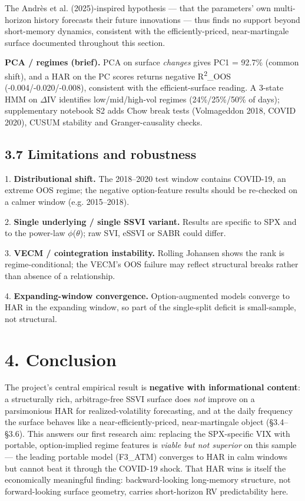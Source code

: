 \documentclass[10pt,a4paper]{article}
\begin{document}
The Andr\`{e}s et al. (2025)-inspired hypothesis --- that the parameters' own multi-horizon history forecasts their future innovations --- thus finds no support beyond short-memory dynamics, consistent with the efficiently-priced, near-martingale surface documented throughout this section.

\noindent \textbf{PCA / regimes (brief).} PCA on surface \textit{changes} gives PC1 = 92.7\% (common shift), and a HAR on the PC scores returns negative R\textsuperscript{2}\_OOS (-0.004/-0.020/-0.008), consistent with the efficient-surface reading. A 3-state HMM on $\Delta$IV identifies low/mid/high-vol regimes (24\%/25\%/50\% of days); supplementary notebook S2 adds Chow break tests (Volmageddon 2018, COVID 2020), CUSUM stability and Granger-causality checks.

\subsection*{3.7 Limitations and robustness}

1. \textbf{Distributional shift.} The 2018--2020 test window contains COVID-19, an extreme OOS regime; the negative option-feature results should be re-checked on a calmer window (e.g. 2015--2018).

2. \textbf{Single underlying / single SSVI variant.} Results are specific to SPX and to the power-law $\phi$($\theta$); raw SVI, eSSVI or SABR could differ.

3. \textbf{VECM / cointegration instability.} Rolling Johansen shows the rank is regime-conditional; the VECM's OOS failure may reflect structural breaks rather than absence of a relationship.

4. \textbf{Expanding-window convergence.} Option-augmented models converge to HAR in the expanding window, so part of the single-split deficit is small-sample, not structural.

\section*{4. Conclusion}

The project's central empirical result is \textbf{negative with informational content}: a structurally rich, arbitrage-free SSVI surface does \textit{not} improve on a parsimonious HAR for realized-volatility forecasting, and at the daily frequency the surface behaves like a near-efficiently-priced, near-martingale object (\S{}3.4--\S{}3.6). This answers our first research aim: replacing the SPX-specific VIX with portable, option-implied regime features is \textit{viable but not superior} on this sample --- the leading portable model (F3\_ATM) converges to HAR in calm windows but cannot beat it through the COVID-19 shock. That HAR wins is itself the economically meaningful finding: backward-looking long-memory structure, not forward-looking surface geometry, carries short-horizon RV predictability here.
\end{document}
